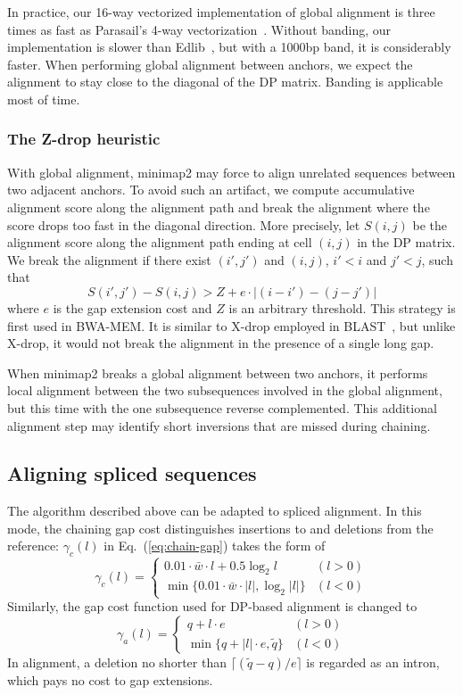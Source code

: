 \documentclass{bioinfo}
\begin{document}
\begin{methods}
In practice, our 16-way vectorized implementation of global alignment is three
times as fast as Parasail's 4-way vectorization~\citep{Daily:2016aa}.  Without
banding, our implementation is slower than Edlib~\citep{Sosic:2017aa}, but with
a 1000bp band, it is considerably faster. When performing global alignment
between anchors, we expect the alignment to stay close to the diagonal of the
DP matrix. Banding is applicable most of time.

\subsubsection{The Z-drop heuristic}

With global alignment, minimap2 may force to align unrelated sequences between
two adjacent anchors. To avoid such an artifact, we compute accumulative
alignment score along the alignment path and break the alignment where the
score drops too fast in the diagonal direction. More precisely, let $S(i,j)$ be
the alignment score along the alignment path ending at cell $(i,j)$ in the DP
matrix. We break the alignment if there exist $(i',j')$ and $(i,j)$, $i'<i$ and
$j'<j$, such that
\[
S(i',j')-S(i,j)>Z+e\cdot|(i-i')-(j-j')|
\]
where $e$ is the gap extension cost and $Z$ is an arbitrary threshold.
This strategy is first used in BWA-MEM. It is similar to X-drop employed in
BLAST~\citep{Altschul:1997vn}, but unlike X-drop, it would not break the
alignment in the presence of a single long gap.

When minimap2 breaks a global alignment between two anchors, it performs local
alignment between the two subsequences involved in the global alignment, but
this time with the one subsequence reverse complemented. This additional
alignment step may identify short inversions that are missed during chaining.

\subsection{Aligning spliced sequences}

The algorithm described above can be adapted to spliced alignment. In this
mode, the chaining gap cost distinguishes insertions to and deletions from the
reference: $\gamma_c(l)$ in Eq.~(\ref{eq:chain-gap}) takes the form of
\[
\gamma_c(l)=\left\{\begin{array}{ll}
0.01\cdot\bar{w}\cdot l+0.5\log_2 l & (l>0) \\
\min\{0.01\cdot\bar{w}\cdot|l|,\log_2|l|\} & (l<0)
\end{array}\right.
\]
Similarly, the gap cost function used for DP-based alignment is changed to
\[
\gamma_a(l)=\left\{\begin{array}{ll}
q+l\cdot e & (l>0) \\
\min\{q+|l|\cdot e,\tilde{q}\} & (l<0)
\end{array}\right.
\]
In alignment, a deletion no shorter than $\lceil(\tilde{q}-q)/e\rceil$ is
regarded as an intron, which pays no cost to gap extensions.


\end{methods}
\end{document}
